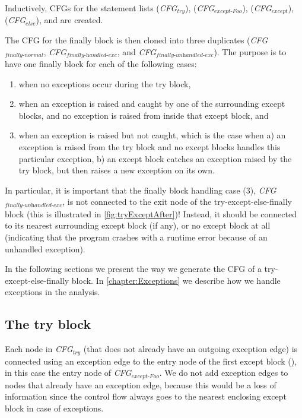 \begin{sloppypar}
  Inductively, CFGs for the statement lists  (\textit{CFG$_{\textit{try}}$}), 
   (\textit{CFG$_{\textit{except-Foo}}$}),  (\textit{CFG$_{\textit{except}}$}), 
   (\textit{CFG$_{\textit{else}}$}), and  are created. 
\end{sloppypar}

The CFG for the finally block is then cloned into three duplicates (\textit{CFG$_{\textit{finally-normal}}$}, 
\textit{CFG$_{\textit{finally-handled-exc}}$}, and \textit{CFG$_{\textit{finally-unhandled-exc}}$}). The purpose is to have one finally block for each of the following cases: 

\begin{enumerate}
  \item when no exceptions occur during the try block,
  \item when an exception is raised and caught by one of the surrounding except blocks, and no exception is raised from inside that except block, and
  \item when an exception is raised but not caught, which is the case when 
    a) an exception is raised from the try block and no except blocks handles this particular exception, 
    b) an except block catches an exception raised by the try block, but then raises a new exception on its own.
\end{enumerate}

In particular, it is important that the finally block handling case (3), \textit{CFG$_{\textit{finally-unhandled-exc}}$}, 
is not connected to the exit node of the try-except-else-finally block (this is illustrated in \autoref{fig:tryExceptAfter})! Instead, it should be connected to its nearest surrounding except block (if any), or no except block at all (indicating that the program crashes with a runtime error because of an unhandled exception).

In the following sections we present the way we generate the CFG of a try-except-else-finally block. In \autoref{chapter:Exceptions} we describe how we handle exceptions in the analysis.


\subsection{The try block}
Each node in \textit{CFG$_{\textit{try}}$} (that does not already have an outgoing exception edge) is connected using an exception edge to the entry node of the first except block (\inlinecode{*}), in this case the entry node of \textit{CFG$_{\textit{except-Foo}}$}. We do not add exception edges to nodes that already have an exception edge, because this would be a loss of information since the control flow always goes to the nearest enclosing except block in case of exceptions.

